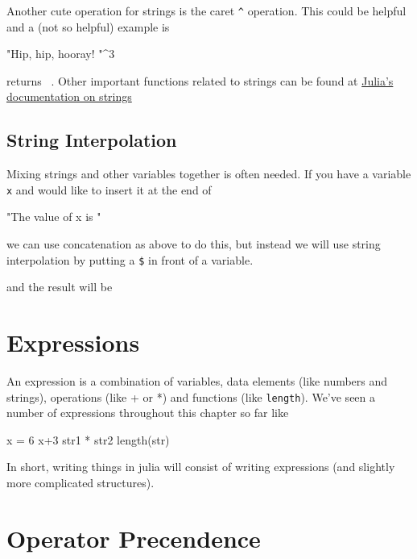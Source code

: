Another cute operation for strings is the caret \verb!^! operation. This could be helpful and a (not so helpful) example is 
\begin{jlblock}[vars]
"Hip, hip, hooray! "^3
\end{jlblock}
%
returns  \printpythontex[verb]~. Other important functions related to strings can be found at \href{https://docs.julialang.org/en/stable/stdlib/strings/}{Julia's documentation on strings}

\subsection{String Interpolation}

Mixing strings and other variables together is often needed. If you have a variable \verb!x! and would like to insert it at the end of 
\begin{jlverbatim}[vars]
"The value of x is "
\end{jlverbatim}
we can use concatenation as above to do this, but instead we will use string interpolation by putting a \verb!$! in front of a variable.
and the result will be  \printpythontex[verbatim]



\section{Expressions}

An expression is a combination of variables, data elements (like numbers and strings), operations (like + or *) and functions (like \verb!length!).  We've seen a number of expressions throughout this chapter so far like 
\begin{jlblock}[vars]
x = 6
x+3
str1 * str2
length(str)
\end{jlblock}

In short, writing things in julia will consist of writing expressions (and slightly more complicated structures).  

\section{Operator Precendence} \label{sect:operator:precedence}

